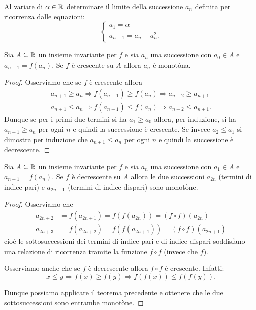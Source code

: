 \begin{exercise}
Al variare di $\alpha \in \mathbb R$
determinare il limite della successione $a_n$ definita per ricorrenza dalle
equazioni:
\[
\begin{cases}
 a_1 = \alpha \\
 a_{n+1} = a_n - a_n^2.
\end{cases}
\]
\end{exercise}

\begin{theorem}
\mymark{**}
  Sia $A\subseteq \mathbb R$ un insieme invariante per $f$ e sia $a_n$ una successione
  con $a_0\in A$ e $a_{n+1} = f(a_n)$. Se $f$ è crescente
  su $A$ allora $a_n$
  è monotòna.
\end{theorem}
\begin{proof}
\mymark{**}
  Osserviamo che se $f$ è crescente allora
  \begin{align*}
    a_{n+1} \ge a_n \Rightarrow f(a_{n+1}) \ge f(a_n) \Rightarrow
    a_{n+2} \ge a_{n+1}\\
    a_{n+1} \le a_n \Rightarrow f(a_{n+1}) \le f(a_n) \Rightarrow a_{n+2} \le a_{n+1}.
  \end{align*}
  Dunque se per i primi due termini si ha $a_1 \ge a_0$ allora, per
  induzione, si ha $a_{n+1} \ge a_n$ per ogni $n$ e quindi la
  successione è crescente. Se invece $a_2 \le a_1$ si dimostra per
  induzione che $a_{n+1} \le a_n$ per ogni $n$ e quindi la successione
  è decrescente.
\end{proof}

\begin{theorem}\label{th_decr}
\mymark{**}
  Sia $A\subseteq \mathbb R$ un insieme invariante per $f$ e sia $a_n$ una successione
  con $a_1\in A$ e $a_{n+1} = f(a_n)$. Se $f$ è decrescente
  su $A$
  allora le due successioni $a_{2n}$ (termini di indice pari) e
  $a_{2n+1}$ (termini di indice dispari) sono monotòne.
\end{theorem}
\begin{proof}
\mymark{**}
  Osserviamo che
  \begin{align*}
    a_{2n+2} &= f(a_{2n+1}) = f(f(a_{2n})) = (f\circ f)(a_{2n})\\
    a_{2n+3} &= f(a_{2n+2}) = f(f(a_{2n+1})) = (f\circ f)(a_{2n+1})
  \end{align*}
cioé le sottosuccessioni dei termini di indice pari e di indice
dispari soddisfano una relazione di ricorrenza tramite la funzione
$f\circ f$ (invece che $f$).

Osserviamo anche che se $f$ è decrescente allora $f\circ f$ è
crescente. Infatti:
\[
x \le y \Rightarrow f(x) \ge f(y) \Rightarrow f(f(x)) \le f(f(y)).
\]

Dunque possiamo applicare il teorema precedente e ottenere che le due
sottosuccessioni sono entrambe monotòne.
\end{proof}

